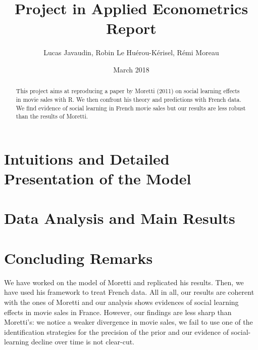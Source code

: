 \documentclass{article}
\title{Project in Applied Econometrics\\ Report}
\author{Lucas Javaudin, Robin Le Huérou-Kérisel, Rémi Moreau}
\date{March 2018}
\begin{document}
\maketitle

%
%
%
%
%
\begin{abstract}
	This project aims at reproducing a paper by Moretti (2011) on social learning effects in movie sales with R. We then confront his theory and predictions with French data. We find evidence of social learning in French movie sales but our results are less robust than the results of Moretti.
\end{abstract}
\tableofcontents
\pagebreak
\section{Intuitions and Detailed Presentation of the Model}


\pagebreak
\section{Data Analysis and Main Results}






\section{Concluding Remarks}


We have worked on the model of Moretti and replicated his results. Then, we have used his framework to treat French data. All in all, our results are coherent with the ones of Moretti and our analysis shows evidences of social learning effects in movie sales in France. However, our findings are less sharp than Moretti's: we notice a weaker divergence in movie sales, we fail to use one of the identification strategies for the precision of the prior and our evidence of social-learning decline over time is not clear-cut. 
\end{document}
